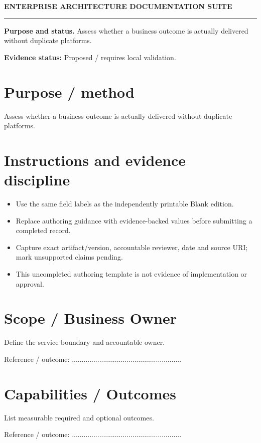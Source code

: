 \documentclass[10pt,letterpaper]{article}
\begin{document}
\begin{center}
{\large\bfseries\color{teal} ENTERPRISE ARCHITECTURE DOCUMENTATION SUITE}\par
{}\par
{}\par
\end{center}
\vspace{8pt}\hrule\vspace{12pt}
\textbf{Purpose and status.} Assess whether a business outcome is actually delivered without duplicate platforms.\par
\textbf{Evidence status:} Proposed / requires local validation.\par
\section{Purpose / method}
Assess whether a business outcome is actually delivered without duplicate platforms.\par
\section{Instructions and evidence discipline}
\begin{itemize}
\item Use the same field labels as the independently printable Blank edition.
\item Replace authoring guidance with evidence-backed values before submitting a completed record.
\item Capture exact artifact/version, accountable reviewer, date and source URI; mark unsupported claims pending.
\item This uncompleted authoring template is not evidence of implementation or approval.
\end{itemize}
\section{Scope / Business Owner}
Define the service boundary and accountable owner.\par
Reference / outcome: ........................................................\par
\section{Capabilities / Outcomes}
List measurable required and optional outcomes.\par
Reference / outcome: ........................................................\par
\end{document}
